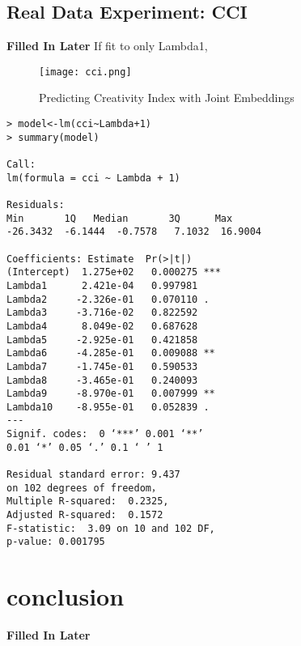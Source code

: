 \documentclass[10pt,journal,compsoc]{IEEEtran}
\begin{document}
\subsection{Real Data Experiment: CCI}
{\bf Filled In Later}
If fit to only Lambda1,
\begin{figure}[!htbp]
	\centering
	\texttt{[image: cci.png]}
	\caption{Predicting Creativity Index with Joint Embeddings}
\end{figure}

\begin{lstlisting}
> model<-lm(cci~Lambda+1)
> summary(model)

Call:
lm(formula = cci ~ Lambda + 1)

Residuals:
Min       1Q   Median       3Q      Max 
-26.3432  -6.1444  -0.7578   7.1032  16.9004 

Coefficients: Estimate  Pr(>|t|)    
(Intercept)  1.275e+02   0.000275 ***
Lambda1      2.421e-04   0.997981    
Lambda2     -2.326e-01   0.070110 .  
Lambda3     -3.716e-02   0.822592    
Lambda4      8.049e-02   0.687628    
Lambda5     -2.925e-01   0.421858    
Lambda6     -4.285e-01   0.009088 ** 
Lambda7     -1.745e-01   0.590533    
Lambda8     -3.465e-01   0.240093    
Lambda9     -8.970e-01   0.007999 ** 
Lambda10    -8.955e-01   0.052839 .  
---
Signif. codes:  0 ‘***’ 0.001 ‘**’ 
0.01 ‘*’ 0.05 ‘.’ 0.1 ‘ ’ 1

Residual standard error: 9.437 
on 102 degrees of freedom，
Multiple R-squared:  0.2325,
Adjusted R-squared:  0.1572 
F-statistic:  3.09 on 10 and 102 DF,  
p-value: 0.001795
\end{lstlisting}

\section{conclusion}
{\bf Filled In Later}
\end{document}
